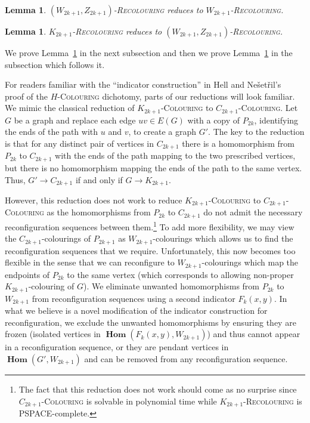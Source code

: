 \documentclass[11 pt]{amsart}
\newtheorem{lem}[equation]{Lemma}
\theoremstyle{definition}
\theoremstyle{case}
\numberwithin{equation}{section}
\newcommand\Hcol[1]{\textsc{$#1$-Colouring}}
\newcommand\Hrec[1]{\textsc{$#1$-Recolouring}}
\newcommand{\bHom}{\operatorname{\mathbf{Hom}}}
\begin{document}
\begin{lem}
\label{colouredtoW}
\Hrec{(W_{2k+1},Z_{2k+1})} reduces to \Hrec{W_{2k+1}}. 
\end{lem}

\begin{lem}
\label{Ktocoloured}
\Hrec{K_{2k+1}} reduces to \Hrec{(W_{2k+1},Z_{2k+1})}.
\end{lem}

We prove Lemma~\ref{colouredtoW} in the next subsection and then we prove Lemma~\ref{Ktocoloured} in the subsection which follows it.

For readers familiar with the ``indicator construction'' in Hell and Ne\v{s}et\v{r}il's~\cite{Hcol} proof of the \Hcol{H} dichotomy, parts of our reductions will look familiar.  We mimic the classical reduction of \Hcol{K_{2k+1}} to \Hcol{C_{2k+1}}. Let $G$ be a graph and replace each edge $uv\in E(G)$ with a copy of $P_{2k}$, identifying the ends of the path with $u$ and $v$, to create a graph $G'$.  The key to the reduction is that for any distinct pair of vertices in $C_{2k+1}$ there is a homomorphism from $P_{2k}$ to $C_{2k+1}$ with the ends of the path mapping to the two prescribed vertices, but there is no homomorphism mapping the ends of the path to the same vertex. Thus, $G'\to C_{2k+1}$ if and only if $G\to K_{2k+1}$. 

However, this reduction does not work to reduce \Hcol{K_{2k+1}} to \Hcol{C_{2k+1}} as the homomorphisms from $P_{2k}$ to $C_{2k+1}$ do not admit the necessary reconfiguration sequences between them.\footnote{The fact that this reduction does not work should come as no surprise since \Hcol{C_{2k+1}} is solvable in polynomial time while \Hrec{K_{2k+1}} is PSPACE-complete.}  To add more flexibility, we may view the $C_{2k+1}$-colourings of $P_{2k+1}$ as $W_{2k+1}$-colourings which allows us to find the reconfiguration sequences that we require.  Unfortunately, this now becomes too flexible in the sense that we can reconfigure to $W_{2k+1}$-colourings which map the endpoints of $P_{2k}$ to the same vertex (which corresponds to allowing non-proper $K_{2k+1}$-colouring of $G$).  We eliminate unwanted homomorphisms from $P_{2k}$ to $W_{2k+1}$ from reconfiguration sequences using a second indicator $F_k(x,y)$. In what we believe is a novel modification of the indicator construction for reconfiguration, we exclude the unwanted homomorphisms by ensuring they are frozen (isolated vertices in $\bHom(F_k(x,y),W_{2k+1})$) and thus cannot appear in a reconfiguration sequence, or they are pendant vertices in $\bHom(G',W_{2k+1})$ and can be removed from any reconfiguration sequence.
\end{document}
